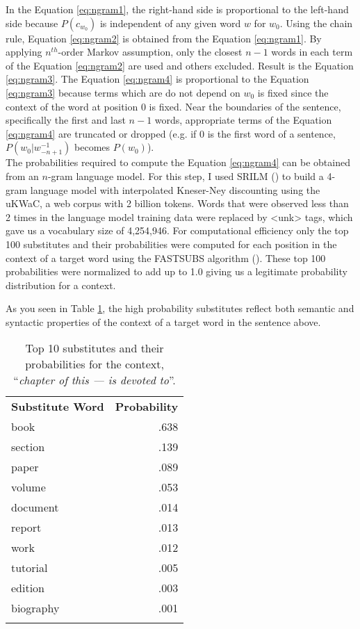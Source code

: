 In the Equation \ref{eq:ngram1}, the right-hand side is proportional
to the left-hand side because $P(c_{w_{0}})$ is independent of any
given word $w$ for $w_{0}$.  Using the chain rule,
Equation \ref{eq:ngram2} is obtained from the Equation
\ref{eq:ngram1}.  By applying $n^{th}$-order Markov assumption, only the
closest $n - 1$ words in each term of the Equation \ref{eq:ngram2} are
used and others excluded. Result is the Equation \ref{eq:ngram3}.  The Equation \ref{eq:ngram4} is proportional to the Equation \ref{eq:ngram3}
because terms which are do not depend on $w_{0}$ is fixed since the
context of the word at position $0$ is fixed.  Near the boundaries of
the sentence, specifically the first and last $n - 1$ words,
appropriate terms of the Equation \ref{eq:ngram4} are truncated or
dropped (e.g. if $0$ is the first word of a sentence, $P(w_{0} | w_{-n
  + 1}^{-1})$ becomes $P(w_{0})$). \\
  
The probabilities required to compute the Equation \ref{eq:ngram4} can
be obtained from an $n$-gram language model. For this step, I used SRILM (\cite{stolcke02srilm}) to build a 4-gram language model with interpolated Kneser-Ney discounting using the uKWaC, a web corpus with 2 billion tokens. Words that were observed less than 2 times in the language model training data were replaced by <unk> tags, which gave us a vocabulary size of 4,254,946. For computational efficiency only the top 100 substitutes and their probabilities were computed for each position in the context of a target word using the FASTSUBS algorithm (\cite{fastsubs}). These top 100 probabilities were normalized to add up to 1.0 giving us a legitimate probability distribution for a context.

As you seen in Table \ref{table:subs}, the high probability substitutes reflect both semantic and syntactic properties of the context of a target word in the sentence above.


\begin{table}
\begin{center}
    \begin{tabular}{ l | r }  \Xhline{2\arrayrulewidth}  
     \bf Substitute Word & \bf Probability \\  \Xhline{2\arrayrulewidth}
     book & .638 \\
     section & .139 \\
     paper & .089 \\
     volume & .053 \\
     document & .014 \\
     report & .013 \\
     work & .012 \\
     tutorial & .005 \\
     edition & .003 \\
     biography & .001 \\
     \Xhline{2\arrayrulewidth}  
    \end{tabular}
\end{center}
    \caption[Top 10 substitutes and their probabilities for a context]{\label{table:subs}{Top 10 substitutes and their probabilities for the context, ``\emph{chapter of this --- is devoted to}''.}}
\end{table}


